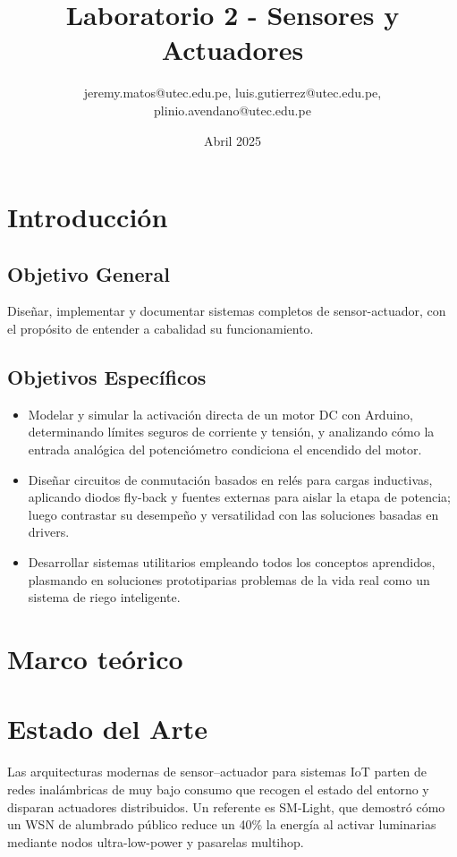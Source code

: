 \documentclass{article}
\title{Laboratorio 2 - Sensores y Actuadores}
\author{jeremy.matos@utec.edu.pe, luis.gutierrez@utec.edu.pe, plinio.avendano@utec.edu.pe}
\date{Abril 2025}
\begin{document}
\maketitle

\newpage
\tableofcontents
\newpage

\section{Introducción}

\subsection{Objetivo General}

Diseñar, implementar y documentar sistemas completos de sensor-actuador, con el propósito de entender a cabalidad su funcionamiento.

\subsection{Objetivos Específicos}

\begin{itemize}
    \item Modelar y simular la activación directa de un motor DC con Arduino, determinando límites seguros de corriente y tensión, y analizando cómo la entrada analógica del potenciómetro condiciona el encendido del motor.
    \item Diseñar circuitos de conmutación basados en relés para cargas inductivas, aplicando diodos fly-back y fuentes externas para aislar la etapa de potencia; luego contrastar su desempeño y versatilidad con las soluciones basadas en drivers.
    \item Desarrollar sistemas utilitarios empleando todos los conceptos aprendidos, plasmando en soluciones prototiparias problemas de la vida real como un sistema de riego inteligente.
\end{itemize}

\newpage

\section{Marco teórico}

\section{Estado del Arte}

Las arquitecturas modernas de sensor–actuador para sistemas IoT parten de redes inalámbricas de muy bajo consumo que recogen el estado del entorno y disparan actuadores distribuidos. Un referente es SM-Light, que demostró cómo un WSN de alumbrado público reduce un 40\% la energía al activar luminarias mediante nodos ultra-low-power y pasarelas multihop. \cite{karapetyan2020smlight}
\end{document}
